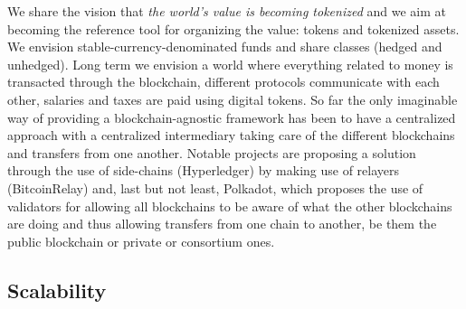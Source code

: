 \documentclass[9pt,oneside]{amsart}
\begin{document}
\begin{multicols}{2}
We share the vision that \textit{the world's value is becoming tokenized} and we aim at becoming the reference tool for organizing the value: tokens and tokenized assets. We envision stable-currency-denominated funds and share classes (hedged and unhedged). Long term we envision a world where everything related to money is transacted through the blockchain, different protocols communicate with each other, salaries and taxes are paid using digital tokens. So far the only imaginable way of providing a blockchain-agnostic framework has been to have a centralized approach with a centralized intermediary taking care of the different blockchains and transfers from one another. Notable projects are proposing a solution through the use of side-chains (Hyperledger) by making use of relayers (BitcoinRelay) and, last but not least, Polkadot, which proposes the use of validators for allowing all blockchains to be aware of what the other blockchains are doing and thus allowing transfers from one chain to another, be them the public blockchain or private or consortium ones.

\subsection{Scalability}


\end{multicols}
\end{document}
